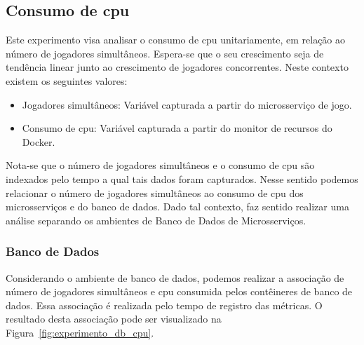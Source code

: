 \subsection{Consumo de \ac{cpu}}

Este experimento visa analisar o consumo de \ac{cpu} unitariamente, em relação ao número de jogadores simultâneos.
%
Espera-se que o seu crescimento seja de tendência linear junto ao crescimento de jogadores concorrentes.
%
Neste contexto existem os seguintes valores:

\begin{itemize}
    \item Jogadores simultâneos: Variável capturada a partir do microsserviço de jogo.
    \item Consumo de \ac{cpu}: Variável capturada a partir do monitor de recursos do Docker.
\end{itemize}

Nota-se que o número de jogadores simultâneos e o consumo de \ac{cpu} são indexados pelo tempo a qual tais dados foram capturados.
%
Nesse sentido podemos relacionar o número de jogadores simultâneos ao consumo de \ac{cpu} dos microsserviços e do banco de dados.
%
Dado tal contexto, faz sentido realizar uma análise separando os ambientes de Banco de Dados de Microsserviços.

\subsubsection{Banco de Dados}

Considerando o ambiente de banco de dados, podemos realizar a associação de número de jogadores simultâneos e \ac{cpu} consumida pelos contêineres de banco de dados.
%
Essa associação é realizada pelo tempo de registro das métricas.
%
O resultado desta associação pode ser visualizado na Figura~\ref{fig:experimento_db_cpu}.



